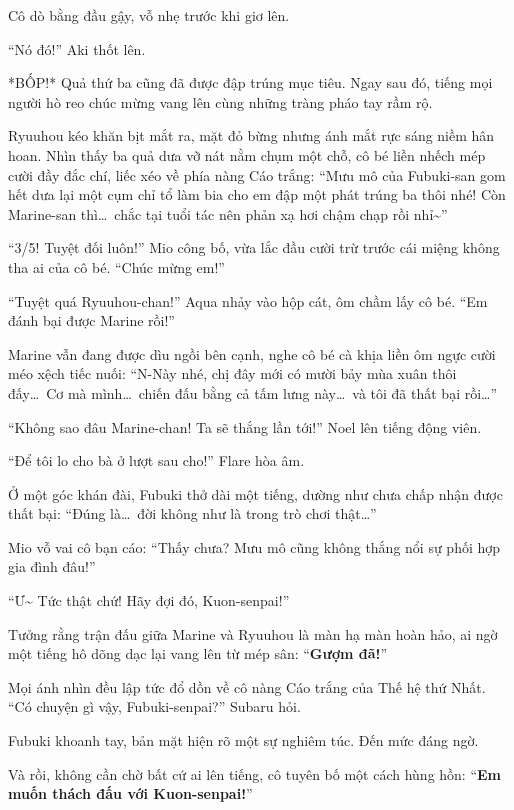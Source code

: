 \documentclass[../main.tex]{subfiles}
\begin{document}
Cô dò bằng đầu gậy, vỗ nhẹ trước khi giơ lên.

``Nó đó!'' Aki thốt lên.

*BỐP!* Quả thứ ba cũng đã được đập trúng mục tiêu. Ngay sau đó, tiếng mọi người hò reo chúc mừng vang lên cùng những tràng pháo tay rầm rộ.

Ryuuhou kéo khăn bịt mắt ra, mặt đỏ bừng nhưng ánh mắt rực sáng niềm hân hoan. Nhìn thấy ba quả dưa vỡ nát nằm chụm một chỗ, cô bé liền nhếch mép cười đầy đắc chí, liếc xéo về phía nàng Cáo trắng: ``Mưu mô của Fubuki-san gom hết dưa lại một cụm chỉ tổ làm bia cho em đập một phát trúng ba thôi nhé! Còn Marine-san thì\dots\ chắc tại tuổi tác nên phản xạ hơi chậm chạp rồi nhỉ\~{}''

``3/5! Tuyệt đối luôn!'' Mio công bố, vừa lắc đầu cười trừ trước cái miệng không tha ai của cô bé. ``Chúc mừng em!''

``Tuyệt quá Ryuuhou-chan!'' Aqua nhảy vào hộp cát, ôm chầm lấy cô bé. ``Em đánh bại được Marine rồi!''

Marine vẫn đang được dìu ngồi bên cạnh, nghe cô bé cà khịa liền ôm ngực cười méo xệch tiếc nuối: ``N-Này nhé, chị đây mới có mười bảy mùa xuân thôi đấy\dots\ Cơ mà mình\dots\ chiến đấu bằng cả tấm lưng này\dots\ và tôi đã thất bại rồi\dots''

``Không sao đâu Marine-chan! Ta sẽ thắng lần tới!'' Noel lên tiếng động viên.

``Để tôi lo cho bà ở lượt sau cho!'' Flare hòa âm.

Ở một góc khán đài, Fubuki thở dài một tiếng, dường như chưa chấp nhận được thất bại: ``Đúng là\dots\ đời không như là trong trò chơi thật\dots''

Mio vỗ vai cô bạn cáo: ``Thấy chưa? Mưu mô cũng không thắng nổi sự phối hợp gia đình đâu!''

``Ư\~{} Tức thật chứ! Hãy đợi đó, Kuon-senpai!''

\ct

Tưởng rằng trận đấu giữa Marine và Ryuuhou là màn hạ màn hoàn hảo, ai ngờ một tiếng hô dõng dạc lại vang lên từ mép sân: ``\textbf{Gượm đã!}''

Mọi ánh nhìn đều lập tức đổ dồn về cô nàng Cáo trắng của Thế hệ thứ Nhất. ``Có chuyện gì vậy, Fubuki-senpai?'' Subaru hỏi.

Fubuki khoanh tay, bản mặt hiện rõ một sự nghiêm túc. Đến mức đáng ngờ.

Và rồi, không cần chờ bất cứ ai lên tiếng, cô tuyên bố một cách hùng hồn: ``\textbf{Em muốn thách đấu với Kuon-senpai!}''
\end{document}
